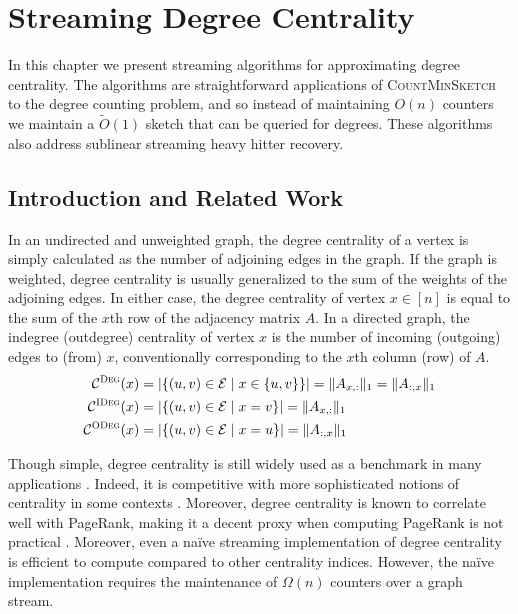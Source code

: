 \documentclass[10]{report}
\newcommand{\algoname}[1]{\textnormal{\textsc{#1}}}
\begin{document}
\chapter{Streaming Degree Centrality} \label{chap:dc}

In this chapter we present streaming algorithms for approximating degree centrality.
The algorithms are straightforward applications of \algoname{CountMinSketch} to the degree counting problem, and so instead of maintaining $O(n)$ counters we maintain a $\widetilde{O}(1)$ sketch that can be queried for degrees.
These algorithms also address sublinear streaming heavy hitter recovery.

\section{Introduction and Related Work} \label{dc:sec:intro}

In an undirected and unweighted graph, the degree centrality of a vertex is simply calculated as the number of adjoining edges in the graph.
If the graph is weighted, degree centrality is usually generalized to the sum of the weights of the adjoining edges. 
In either case, the degree centrality of  vertex $x \in [n]$ is equal to the sum of the $x$th row of the adjacency matrix $A$.
In a directed graph, the indegree (outdegree) centrality of vertex $x$ is the number of incoming (outgoing) edges to (from) $x$, conventionally corresponding to the $x$th column (row) of $A$.
%
\begin{align} 
\label{eq:dc}
\mathcal{C}^{\algoname{Deg}}(x) 
&= |\{(u,v) \in \mathcal{E} \mid x \in \{u,v\} \}| 
= \| A_{x,:} \|_1 
= \| A_{:,x} \|_1 \\
\label{eq:idc}
\mathcal{C}^{\algoname{IDeg}}(x) 
&= |\{(u,v) \in \mathcal{E} \mid x =v \}| 
= \| A_{x,:} \|_1 \\
\label{eq:odc}
\mathcal{C}^{\algoname{ODeg}}(x) 
&= |\{(u,v) \in \mathcal{E} \mid x =u \}|
= \| A_{:,x} \|_1
\end{align}
%


Though simple, degree centrality is still widely used as a benchmark in many applications \cite{boldi2014axioms}. 
Indeed, it is competitive with more sophisticated notions of centrality in some contexts \cite{upstill2003predicting}.
Moreover, degree centrality is known to correlate well with PageRank, making it a decent proxy when computing PageRank is not practical \cite{upstill2003predicting}.
Moreover, even a na\"ive streaming implementation of degree centrality is efficient to compute compared to other centrality indices.
However, the na\"ive implementation requires the maintenance of $\Omega(n)$ counters over a graph stream. 
\end{document}
